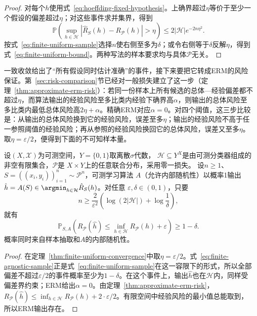 \begin{proof}
对每个$h$使用式~\eqref{eq:hoeffding-fixed-hypothesis}。上确界超过$\eta$等价于至少一个假设的偏差超过$\eta$；对这些事件求并集界，得到
\[
 \mathbb P\left(\sup_{h\in\mathcal H}|\hat R_S(h)-R_{\mathcal P}(h)|>\eta\right)
 \leq 2|\mathcal H|e^{-2n\eta^2}.
\]
按式~\eqref{eq:finite-uniform-sample}选择$n$使右侧至多为$\delta$；或令右侧等于$\delta$反解$\eta$，得到式~\eqref{eq:finite-uniform-bound}。两种写法的样本要求均与具体$\mathcal P$无关。
\end{proof}

一致收敛给出了“所有假设同时估计准确”的事件，接下来要把它转成ERM的风险保证。第~\ref{sec:risk-comparison}节已经对一般损失建立了这一步（定理~\ref{thm:approximate-erm-risk}）：若同一份样本上所有候选的总体—经验偏差都不超过$\eta$，而算法输出的经验风险至多比类内经验下确界高$\alpha$，则输出的总体风险至多比类内最低总体风险高$2\eta+\alpha$。精确ERM对应$\alpha=0$。对四个阈值，这三步比较是：从输出的总体风险换到它的经验风险，误差至多$\eta$；输出的经验风险不高于任一参照阈值的经验风险；再从参照的经验风险换回它的总体风险，误差又至多$\eta$。取$\eta=\varepsilon/2$，便得到下面的不可知样本量。

\begin{theorem}[有限假设空间的不可知PAC样本量界]
\label{thm:finite-agnostic-pac}
设$(X,\mathcal X)$为可测空间，$Y=\{0,1\}$取离散$\sigma$代数，
$\mathcal H\subseteq Y^X$是由可测分类器组成的非空有限集合，$\mathcal P$是
$X\times Y$上的任意联合分布，采用零一损失。
设$n\geq1$、$S=((x_i,y_i))_{i=1}^n\sim\mathcal P^n$，可测学习算法
$A$（允许内部随机性）以概率1输出
$\hat h=A(S)\in\argmin_{h\in\mathcal H}\hat R_S(h)$。对任意
$\varepsilon,\delta\in(0,1)$，只要
\begin{equation}
 n\geq\frac{2}{\varepsilon^2}
 \left(\log(2|\mathcal H|)+\log\frac1\delta\right),
 \label{eq:finite-agnostic-sample}
\end{equation}
就有
\[
 \mathbb P_{S,A}\left(
 R_{\mathcal P}(\hat h)\leq\inf_{h\in\mathcal H}R_{\mathcal P}(h)+\varepsilon
 \right)\geq1-\delta.
\]
概率同时来自样本抽取和$A$的内部随机性。
\end{theorem}

\begin{proof}
在定理~\ref{thm:finite-uniform-convergence}中取$\eta=\varepsilon/2$。式~\eqref{eq:finite-agnostic-sample}正是式~\eqref{eq:finite-uniform-sample}在这一容限下的形式，所以全部偏差不超过$\varepsilon/2$的事件概率至少为$1-\delta$。在这个事件上，输出$\hat h$也在$\mathcal H$内，同样受偏差界约束；ERM给出$\alpha=0$。由定理~\ref{thm:approximate-erm-risk}，$R_{\mathcal P}(\hat h)\leq\inf_{h\in\mathcal H}R_{\mathcal P}(h)+2\cdot\varepsilon/2$。有限空间中经验风险的最小值总能取到，所以ERM输出存在。
\end{proof}

